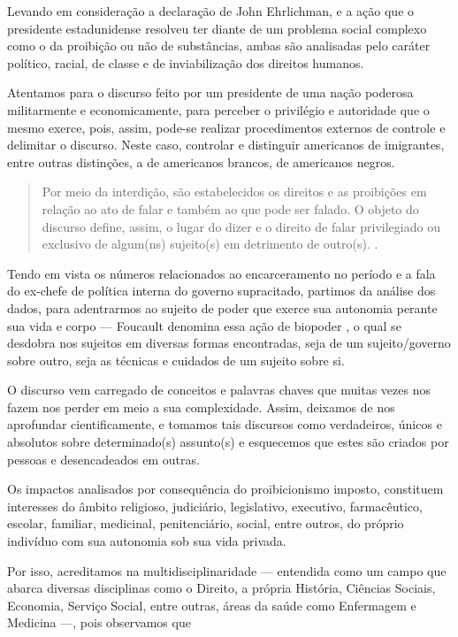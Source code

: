 \begin{refsection}
    Levando em consideração a declaração de John Ehrlichman, e a ação que o presidente estadunidense resolveu ter diante de um problema social complexo como o da proibição ou não de substâncias, ambas são analisadas pelo caráter político, racial, de classe e de inviabilização dos direitos humanos.

    Atentamos para o discurso feito por um presidente de uma nação poderosa militarmente e economicamente, para perceber o privilégio e autoridade que o mesmo exerce, pois, assim, pode-se realizar procedimentos externos de controle e delimitar o discurso. Neste caso, controlar e distinguir americanos de imigrantes, entre outras distinções, a de americanos brancos, de americanos negros.

    \begin{quotation}
        Por meio da interdição, são estabelecidos os direitos e as proibições em relação ao ato de falar e também ao que pode ser falado. O objeto do discurso define, assim, o lugar do dizer e o direito de falar privilegiado ou exclusivo de algum(ns) sujeito(s) em detrimento de outro(s). \cite[p.~48]{Fernandes2012Discurso}.
    \end{quotation}

    Tendo em vista os números relacionados ao encarceramento no período \cite[p.~182]{ColetivoDar2016Dichavando} e a fala do ex-chefe de política interna do governo supracitado, partimos da análise dos dados, para adentrarmos ao sujeito de poder que exerce sua autonomia perante sua vida e corpo --- Foucault denomina essa ação de biopoder \cite{Fernandes2012Discurso}, o qual se desdobra nos sujeitos em diversas formas encontradas, seja de um sujeito/governo sobre outro, seja as técnicas e cuidados de um sujeito sobre si.

    O discurso vem carregado de conceitos e palavras chaves que muitas vezes nos fazem nos perder em meio a sua complexidade. Assim, deixamos de nos aprofundar cientificamente, e tomamos tais discursos como verdadeiros, únicos e absolutos sobre determinado(s) assunto(s) e esquecemos que estes são criados por pessoas e desencadeados em outras.  

    Os impactos analisados por consequência do proibicionismo imposto, constituem interesses do âmbito religioso, judiciário, legislativo, executivo, farmacêutico, escolar, familiar, medicinal, penitenciário, social, entre outros, do próprio indivíduo com sua autonomia sob sua vida privada. 

    Por isso, acreditamos na multidisciplinaridade --- entendida como um campo que abarca diversas disciplinas como o Direito, a própria História, Ciências Sociais, Economia, Serviço Social, entre outras, áreas da saúde como Enfermagem e Medicina ---, pois observamos que


\end{refsection}
